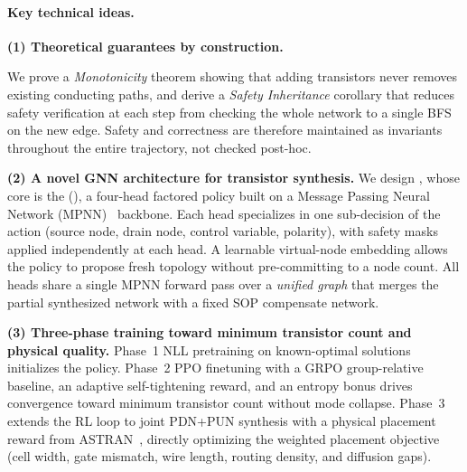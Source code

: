 \paragraph{Key technical ideas.}
\textbf{(1) Theoretical guarantees by construction.}

We prove a \emph{Monotonicity} theorem showing that adding transistors
never removes existing conducting paths, and derive a
\emph{Safety Inheritance} corollary that reduces safety verification
at each step from checking the whole network to a single BFS on the
new edge.
Safety and correctness are therefore maintained as invariants throughout
the entire trajectory, not checked post-hoc.

\textbf{(2) A novel GNN architecture for transistor synthesis.}
We design \method, whose core is the \sgpn (\SGPN), a four-head
factored policy built on a Message Passing Neural Network (MPNN)~\cite{gilmer2017mpnn} backbone.
Each head specializes in one sub-decision of the action
(source node, drain node, control variable, polarity),
with safety masks applied independently at each head.
A learnable virtual-node embedding allows the policy to propose
fresh topology without pre-committing to a node count.
All heads share a single MPNN forward pass over a
\emph{unified graph} that merges the partial synthesized network
with a fixed SOP compensate network.

\textbf{(3) Three-phase training toward minimum transistor count and physical quality.}
Phase~1 NLL pretraining on known-optimal solutions initializes the policy.
Phase~2 PPO finetuning with a GRPO group-relative baseline, an adaptive
self-tightening reward, and an entropy bonus drives convergence toward
minimum transistor count without mode collapse.
Phase~3 extends the RL loop to joint PDN+PUN synthesis with a physical
placement reward from ASTRAN~\cite{astran}, directly optimizing the
weighted placement objective (cell width, gate mismatch, wire length,
routing density, and diffusion gaps).

